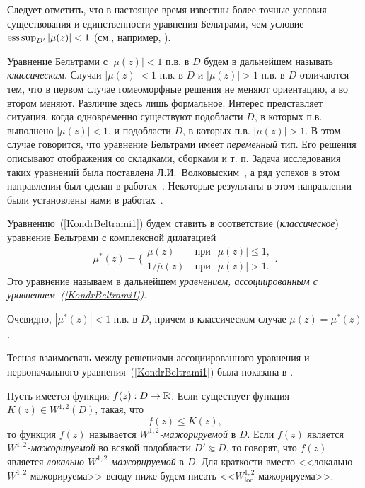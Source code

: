 Следует отметить, что в настоящее время известны более точные условия существования и единственности уравнения Бельтрами, чем  условие $\mathop{\mathrm{ess\, sup}}\nolimits_{D'}|\mu(z)|<1$ (см., например, \cite{KondrMikl1,KondrMikl}).

Уравнение Бельтрами с  $|\mu(z)|<1$   п.в. в $D$ будем в дальнейшем называть  \emph{классическим}. Случаи
$|\mu(z)|<1$ п.в. в $D$ и $|\mu(z)|>1$
 п.в. в $D$ отличаются тем, что в первом случае гомеоморфные решения не меняют  ориентацию, а во втором меняют.
Различие здесь лишь формальное.
Интерес представляет ситуация, когда одновременно существуют  подобласти $D$, в которых п.в. выполнено $|\mu(z)|<1$, и
подобласти $D$, в которых  п.в. $|\mu(z)|>1$. В этом случае
говорится, что уравнение Бельтрами имеет
\emph{переменный} тип.
Его решения описывают отображения со складками, сборками и т. п.
Задача исследования таких уравнений  была поставлена Л.И.~Волковыским~\cite{KondrVolkovyskii}, а ряд успехов в этом направлении был сделан в работах~\cite{KondrSrYak,KondrSrYak3}.
Некоторые результаты в этом направлении
были установлены  нами в работах~\cite{KondrSibMat,KondrVV2016}.


Уравнению~(\ref{KondrBeltrami1}) будем ставить в соответствие (\emph{классическое}) уравнение Бельтрами с комплексной дилатацией
\begin{equation}\label{mu1}
\mu^{*}(z)=\biggl\lbrace
\begin{array}{ll}
\mu(z)& \ \mbox{при} \  \    |\mu(z)|\leq1,\\[5pt]
1 / \overline{\mu}(z)& \ \mbox{при} \ \   |\mu(z)|>1.
\end{array}
\biggr.\nonumber
\end{equation}
 Это уравнение называем в дальнейшем  \emph{уравнением,  ассоциированным с  уравнением~\emph{(\ref{KondrBeltrami1})}}.

Очевидно,  ${|\mu^{*}(z)|<1}$ п.в. в $D$,
причем в  классическом случае $\mu(z)=\mu^{*}(z)$.

Тесная взаимосвязь между решениями ассоциированного уравнения и  первоначального уравнения~(\ref{KondrBeltrami1}) была показана
в \cite{KondrYak,KondrSibMat,KondrVV2014}.

Пусть имеется функция $f(z):D\to\mathbb{R}$. Если существует
функция $K(z)\in W^{1,2}(D)$, такая, что
$$f(z)\leq K(z),$$
 то функция $f(z)$ называется  \emph{$W^{1,2}$-ма\-жо\-ри\-руе\-мой} в $D$.
Если $f(z)$ является \emph{$W^{1,2}$-ма\-жо\-ри\-руе\-мой}
во всякой подобласти $D'\Subset D$, то говорят, что
$f(z)$ является \emph{локально $W^{1,2}$-ма\-жо\-ри\-руе\-мой}
в $D$.
Для краткости вместо <<локально $W^{1,2}$-ма\-жо\-ри\-руе\-ма>>
всюду ниже будем писать <<$W^{1,2}_{\mathrm{loc}}$-ма\-жо\-ри\-ру\-е\-ма>>.


